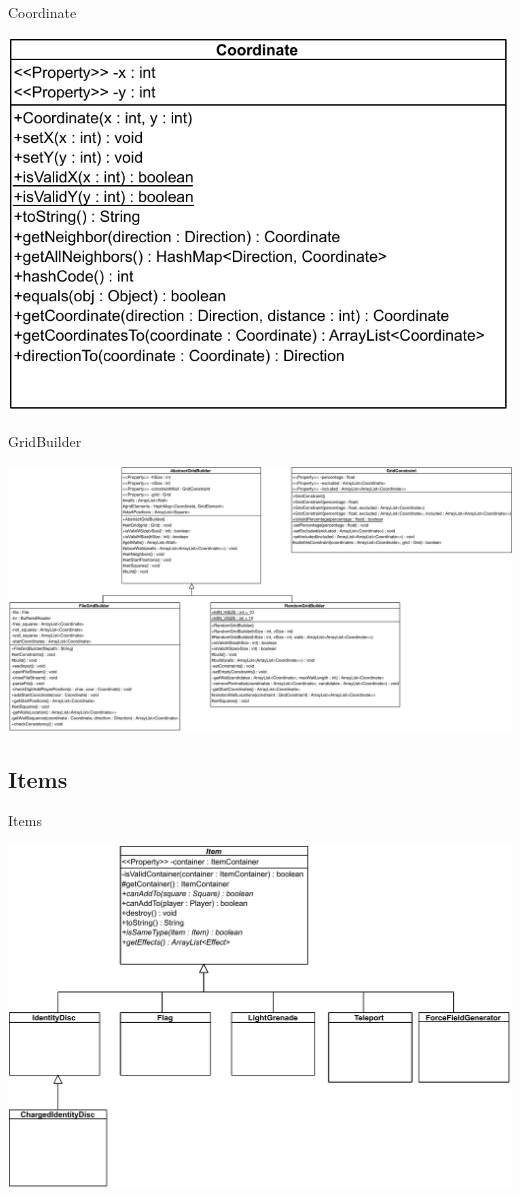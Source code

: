 \documentclass[11pt,t]{beamer}
\begin{document}
\begin{frame}{Coordinate}
\begin{center}
\includegraphics[scale=0.5]{images/coordinate}
\end{center}
\end{frame}


\begin{frame}{GridBuilder}
\begin{center}
\includegraphics[width=1\linewidth]{images/gridbuilder}
\end{center}
\end{frame}

\subsection{Items}

\begin{frame}{Items}
\begin{center}
\includegraphics[width=0.7\linewidth]{images/items}
\end{center}
\end{frame}
\end{document}
